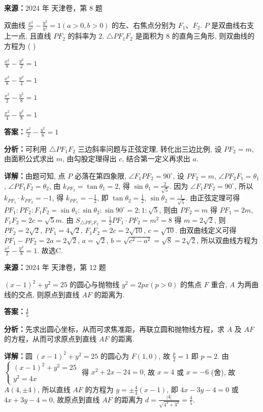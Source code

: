 \begin{question}[points=5]
\textbf{来源：}2024 年 天津卷，第 8 题\par
双曲线 $\frac{x^2}{a^2}-\frac{y^2}{b^2}=1(a>0,b>0)$ 的左、右焦点分别为 $F_1$、$F_2$. $P$ 是双曲线右支上一点, 且直线 $PF_2$ 的斜率为 $2$. $\triangle PF_1F_2$ 是面积为 $8$ 的直角三角形, 则双曲线的方程为 ( )
\begin{choices}
  \item $\frac{x^2}{8}-\frac{y^2}{2}=1$
  \item $\frac{x^2}{8}-\frac{y^2}{4}=1$
  \item $\frac{x^2}{2}-\frac{y^2}{8}=1$
  \item $\frac{x^2}{4}-\frac{y^2}{8}=1$
\end{choices}
\begin{solution}
\textbf{答案：}$\frac{x^2}{2}-\frac{y^2}{8}=1$

\textbf{分析：}可利用 $\triangle PF_1F_2$ 三边斜率问题与正弦定理, 转化出三边比例, 设 $PF_2=m$, 由面积公式求出 $m$, 由勾股定理得出 $c$, 结合第一定义再求出 $a$.

\textbf{详解：}由题可知, 点 $P$ 必落在第四象限, $\angle F_1PF_2=90^\circ$, 设 $PF_2=m$, $\angle PF_2F_1=\theta_1$, $\angle PF_1F_2=\theta_2$, 由 $k_{PF_2}=\tan\theta_1=2$, 得 $\sin\theta_1=\frac{2}{\sqrt{5}}$. 因为 $\angle F_1PF_2=90^\circ$, 所以 $k_{PF_1}\cdot k_{PF_2}=-1$, 得 $k_{PF_1}=-\frac{1}{2}$, 即 $\tan\theta_2=\frac{1}{2}$, $\sin\theta_2=\frac{1}{\sqrt{5}}$. 由正弦定理可得 $PF_1:PF_2:F_1F_2=\sin\theta_1:\sin\theta_2:\sin90^\circ=2:1:\sqrt{5}$, 则由 $PF_2=m$ 得 $PF_1=2m$, $F_1F_2=2c=\sqrt{5}m$. 由 $S_{\triangle PF_1F_2}=\frac{1}{2}PF_1\cdot PF_2=m^2=8$ 得 $m=2\sqrt{2}$, 则 $PF_2=2\sqrt{2}$, $PF_1=4\sqrt{2}$, $F_1F_2=2c=2\sqrt{10}$, $c=\sqrt{10}$. 由双曲线定义可得 $PF_1-PF_2=2a=2\sqrt{2}$, $a=\sqrt{2}$, $b=\sqrt{c^2-a^2}=\sqrt{8}=2\sqrt{2}$, 所以双曲线方程为 $\frac{x^2}{2}-\frac{y^2}{8}=1$. 故选C.
\end{solution}
\end{question}

\begin{question}[points=5]
\textbf{来源：}2024 年 天津卷，第 12 题\par
$(x-1)^2+y^2=25$ 的圆心与抛物线 $y^2=2px(p>0)$ 的焦点 $F$ 重合, $A$ 为两曲线的交点, 则原点到直线 $AF$ 的距离为.
\fillin[{$\frac{4}{5}$}]
\begin{solution}
\textbf{答案：}$\frac{4}{5}$

\textbf{分析：}先求出圆心坐标，从而可求焦准距，再联立圆和抛物线方程，求 $A$ 及 $AF$ 的方程，从而可求原点到直线 $AF$ 的距离.

\textbf{详解：}圆 $(x-1)^2+y^2=25$ 的圆心为 $F(1,0)$, 故 $\frac{p}{2}=1$ 即 $p=2$. 由 $\begin{cases} (x-1)^2+y^2=25 \\ y^2=4x \end{cases}$ 得 $x^2+2x-24=0$, 故 $x=4$ 或 $x=-6$ (舍), 故 $A(4,\pm4)$, 所以直线 $AF$ 的方程为 $y=\pm\frac{4}{3}(x-1)$, 即 $4x-3y-4=0$ 或 $4x+3y-4=0$, 故原点到直线 $AF$ 的距离为 $d=\frac{|4|}{\sqrt{4^2+3^2}}=\frac{4}{5}$.
\end{solution}
\end{question}

